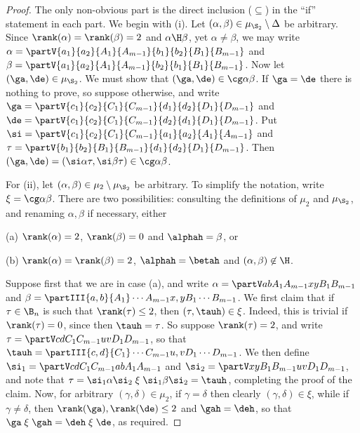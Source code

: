 \begin{proof}
The only non-obvious part is the direct inclusion ($\subseteq$) in the ``if'' statement in each part.
%
We begin with (i).
Let $(\alpha,\beta)\in\mu_{\S_2}\setminus\Delta$ be arbitrary.
Since $\rank(\alpha)=\rank(\beta)=2$ and $\alpha\H\beta$, yet $\alpha\not=\beta$, we may write
%
$\alpha = \partV {a_1}{a_2}{A_1}{A_{m-1}}{b_1}{b_2}{B_1}{B_{m-1}}$ and $\beta = \partV {a_1}{a_2}{A_1}{A_{m-1}}{b_2}{b_1}{B_1}{B_{m-1}}$.
%
Now let $(\ga,\de)\in\mu_{\S_2}$.  We must show that $(\ga,\de)\in\cg\alpha\beta$.
%
If $\ga=\de$ there is nothing to prove, so suppose otherwise, and write
%
$\ga = \partV {c_1}{c_2}{C_1}{C_{m-1}}{d_1}{d_2}{D_1}{D_{m-1}}$ and $\de = \partV {c_1}{c_2}{C_1}{C_{m-1}}{d_2}{d_1}{D_1}{D_{m-1}}$.
%
Put
%
$\si = \partV{c_1}{c_2}{C_1}{C_{m-1}}{a_1}{a_2}{A_1}{A_{m-1}}$ and $\tau = \partV{b_1}{b_2}{B_1}{B_{m-1}}{d_1}{d_2}{D_1}{D_{m-1}}$.
%
Then $(\ga,\de)=(\si\alpha\tau,\si\beta\tau)\in\cg\alpha\beta$.

For (ii), let $(\alpha,\beta)\in\mu_{2}\setminus\mu_{\S_2}$  be arbitrary.
To simplify the notation, write $\xi=\cg\alpha\beta$.  There are two possibilities: consulting the definitions of $\mu_2$ and $\mu_{\S_2}$, and renaming $\alpha,\beta$ if necessary, either
\begin{itemize}\begin{multicols}{2}
\item[(a)] $\rank(\alpha)=2$, $\rank(\beta)=0$ and $\alphah=\beta$, or
\item[(b)] $\rank(\alpha)=\rank(\beta)=2$, $\alphah=\betah$ and $(\alpha,\beta)\not\in{\H}$.
\end{multicols}
\end{itemize}
Suppose first that we are in case (a), and write $\alpha=\partV ab{A_1}{A_{m-1}}xy{B_1}{B_{m-1}}$ and $\beta=\partIII{a,b}{A_1}\cdots{A_{m-1}}{x,y}{B_1}\cdots{B_{m-1}}$.
We first claim that if $\tau\in\B_n$ is such that $\rank(\tau)\leq2$, then
$(\tau,\tauh)\in\xi$.  Indeed, this is trivial if $\rank(\tau)=0$, since then
$\tauh=\tau$.  So suppose $\rank(\tau)=2$, and write $\tau=\partV cd{C_1}{C_{m-1}}uv{D_1}{D_{m-1}}$, so that $\tauh=\partIII{c,d}{C_1}\cdots{C_{m-1}}{u,v}{D_1}\cdots{D_{m-1}}$.  We then define $\si_1=\partV cd{C_1}{C_{m-1}}ab{A_1}{A_{m-1}}$ and $\si_2=\partV xy{B_1}{B_{m-1}}uv{D_1}{D_{m-1}}$, and note that $\tau = \si_1\alpha\si_2 \mathrel\xi \si_1\beta\si_2 =\tauh$, completing the proof of the claim.
Now, for arbitrary $(\gamma,\delta)\in\mu_2$, if $\gamma=\delta$ then clearly $(\gamma,\delta)\in\xi$, while if $\gamma\neq\delta$, then $\rank(\ga),\rank(\de)\leq2$ and $\gah=\deh$, so that $\ga \mathrel\xi \gah = \deh \mathrel\xi \de$, as required.



\end{proof}

